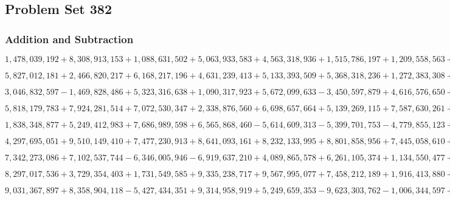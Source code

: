 \hypertarget{problem-set-382}{%
\subsection{Problem Set 382}\label{problem-set-382}}

\hypertarget{addition-and-subtraction}{%
\subsubsection{Addition and
Subtraction}\label{addition-and-subtraction}}

\(1,478,039,192+8,308,913,153+1,088,631,502+5,063,933,583+4,563,318,936+1,515,786,197+1,209,558,563+1,843,479,303+1,360,033,601+6,275,780,009\)

\(5,827,012,181+2,466,820,217+6,168,217,196+4,631,239,413+5,133,393,509+5,368,318,236+1,272,383,308+3,734,978,562+7,289,524,700+5,689,092,535\)

\(3,046,832,597-1,469,828,486+5,323,316,638+1,090,317,923+5,672,099,633-3,450,597,879+4,616,576,650+2,490,531,866-6,087,202,362-2,060,006,143\)

\(5,818,179,783+7,924,281,514+7,072,530,347+2,338,876,560+6,698,657,664+5,139,269,115+7,587,630,261+8,889,254,029+1,070,797,560+2,544,433,806\)

\(1,838,348,877+5,249,412,983+7,686,989,598+6,565,868,460-5,614,609,313-5,399,701,753-4,779,855,123+4,718,397,326-7,372,173,189+5,226,089,928\)

\(4,297,695,051+9,510,149,410+7,477,230,913+8,641,093,161+8,232,133,995+8,801,858,956+7,445,058,610+5,932,935,282+5,090,830,532+5,159,256,924\)

\(7,342,273,086+7,102,537,744-6,346,005,946-6,919,637,210+4,089,865,578+6,261,105,374+1,134,550,477+1,790,088,083-9,911,246,085-1,025,755,541\)

\(8,297,017,536+3,729,354,403+1,731,549,585+9,335,238,717+9,567,995,077+7,458,212,189+1,916,413,880+8,261,869,572+9,872,992,690+1,007,645,965\)

\(9,031,367,897+8,358,904,118-5,427,434,351+9,314,958,919+5,249,659,353-9,623,303,762-1,006,344,597+3,211,691,813+2,908,950,955-7,443,428,246\)

